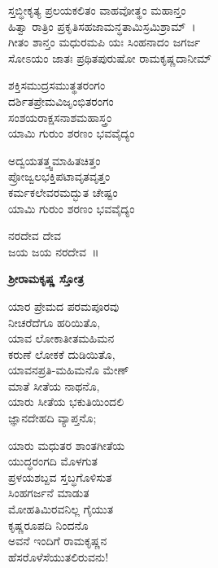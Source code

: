 
\begin{myquote}
ಸ್ತಬ್ಧೀಕೃತ್ಯ ಪ್ರಲಯಕಲಿತಂ ವಾಹವೋತ್ಥಂ ಮಹಾನ್ತಂ\\ಹಿತ್ವಾ ರಾತ್ರಿಂ ಪ್ರಕೃತಿಸಹಜಾಮನ್ಧತಾಮಿಸ್ರಮಿಶ್ರಾಮ್~।\\
ಗೀತಂ ಶಾನ್ತಂ ಮಧುರಮಪಿ ಯಃ ಸಿಂಹನಾದಂ ಜಗರ್ಜ\\ಸೋಽಯಂ ಜಾತಃ ಪ್ರಥಿತಪುರುಷೋ ರಾಮಕೃಷ್ಣದಾನೀಮ್
\end{myquote}


\begin{myquote}
ಶಕ್ತಿಸಮುದ್ರಸಮುತ್ಥತರಂಗಂ\\ದರ್ಶಿತಪ್ರೇಮವಿಜೃಂಭಿತರಂಗಂ\\ಸಂಶಯರಾಕ್ಷಸನಾಶಮಹಾಸ್ತ್ರಂ\\ಯಾಮಿ ಗುರುಂ ಶರಣಂ ಭವವೈದ್ಯಂ
\end{myquote}


\begin{myquote}
ಅದ್ವಯತತ್ತ್ವಮಾಹಿತಚಿತ್ತಂ\\ಪ್ರೋಜ್ವಲಭಕ್ತಿಪಟಾವೃತವೃತ್ತಂ\\ಕರ್ಮಕಲೇವರಮದ್ಭುತ ಚೇಷ್ಟಂ\\ಯಾಮಿ ಗುರುಂ ಶರಣಂ ಭವವೈದ್ಯಂ
\end{myquote}


\begin{myquote}
ನರದೇವ ದೇವ\\ಜಯ ಜಯ ನರದೇವ~॥
\end{myquote}

\begin{center}
\textbf{ಶ‍್ರೀರಾಮಕೃಷ್ಣ ಸ್ತೋತ್ರ}
\end{center}

\begin{myquote}
ಯಾರ ಪ್ರೇಮದ ಪರಮಪೂರವು\\ನೀಚರೆದೆಗೂ ಹರಿಯಿತೊ,\\ಯಾವ ಲೋಕಾತೀತಮಹಿಮನ\\ಕರುಣೆ ಲೋಕಕೆ ದುಡಿಯಿತೊ,\\ಯಾವನಪ್ರತಿ-ಮಹಿಮನೊ ಮೇಣ್\\ಮಾತೆ ಸೀತೆಯ ನಾಥನೊ,\\ಯಾರು ಸೀತೆಯ ಭಕುತಿಯಿಂದಲಿ\\ಜ್ಞಾನದೇಹದಿ ವ್ಯಾಪ್ತನೊ;
\end{myquote}

\begin{myquote}
ಯಾರು ಮಧುತರ ಶಾಂತಗೀತೆಯ\\ಯುದ್ಧರಂಗದಿ ಮೊಳಗುತ\\ಪ್ರಳಯಶಬ್ದವ ಸ್ತಬ್ಧಗೊಳಿಸುತ\\ಸಿಂಹಗರ್ಜನೆ ಮಾಡುತ\\ಮೋಹತಿಮಿರವನಿಲ್ಲ ಗೈಯುತ\\ಕೃಷ್ಣರೂಪದಿ ನಿಂದನೊ\\ಅವನೆ ಇಂದಿಗೆ ರಾಮಕೃಷ್ಣನ\\ಹೆಸರೊಳೆಸೆಯುತಲಿರುವನು!
\end{myquote}

